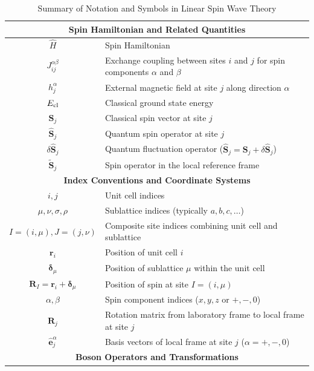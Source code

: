 \documentclass[aps, prx, nofootinbib, superscriptaddress]{revtex4-2}
\begin{document}
\begin{table}[t]
    \centering
    \caption{Summary of Notation and Symbols in Linear Spin Wave Theory}
    \begin{tabular}{c|l}
    \multicolumn{2}{c}{\textbf{Spin Hamiltonian and Related Quantities}} \\
    \hline
    $\hat{H}$ & Spin Hamiltonian \\
    $J_{ij}^{\alpha\beta}$ & Exchange coupling between sites $i$ and $j$ for spin components $\alpha$ and $\beta$ \\
    $h_j^{\alpha}$ & External magnetic field at site $j$ along direction $\alpha$ \\
    $E_{\rm cl}$ & Classical ground state energy \\
    $\mathbf{S}_j$ & Classical spin vector at site $j$ \\
    $\hat{\mathbf{S}}_j$ & Quantum spin operator at site $j$ \\
    $\delta\hat{\mathbf{S}}_j$ & Quantum fluctuation operator ($\hat{\mathbf{S}}_j = \mathbf{S}_j + \delta\hat{\mathbf{S}}_j$) \\
    $\widetilde{\mathbf{S}}_j$ & Spin operator in the local reference frame \\
    \hline
    \multicolumn{2}{c}{\textbf{Index Conventions and Coordinate Systems}} \\
    \hline
    $i, j$ & Unit cell indices \\
    $\mu, \nu, \sigma, \rho$ & Sublattice indices (typically $a, b, c, \dots$) \\
    $I = (i, \mu), J = (j, \nu)$ & Composite site indices combining unit cell and sublattice \\
    $\mathbf{r}_i$ & Position of unit cell $i$ \\
    $\boldsymbol{\delta}_\mu$ & Position of sublattice $\mu$ within the unit cell \\
    $\mathbf{R}_I = \mathbf{r}_i + \boldsymbol{\delta}_\mu$ & Position of spin at site $I = (i, \mu)$ \\
    $\alpha, \beta$ & Spin component indices ($x, y, z$ or $+, -, 0$) \\
    $\mathbf{R}_j$ & Rotation matrix from laboratory frame to local frame at site $j$ \\
    $\hat{\mathbf{e}}_j^{\alpha}$ & Basis vectors of local frame at site $j$ ($\alpha = +, -, 0$) \\
    \hline
    \multicolumn{2}{c}{\textbf{Boson Operators and Transformations}} \\

\end{tabular}
\end{table}
\end{document}
